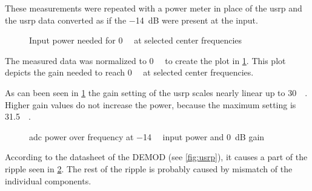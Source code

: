 \documentclass[12pt,a4paper,parskip=full,abstracton]{scrartcl}
\begin{document}
These measurements were repeated with a power meter in place of the
\gls{usrp} and the \gls{usrp} data converted as if the \SI{-14}{\deci\bel}
were present at the input.

\begin{figure}[htb]
    \centering
{}
    \caption{Input power needed for \SI{0}{\deci\belfs} at selected center frequencies}
    \label{fig:inputfscrf}
\end{figure}

The measured data was normalized to \SI{0}{\deci\belfs} to create the plot in \cref{fig:inputfscrf}.
This plot depicts the gain needed to reach \SI{0}{\deci\belfs} at selected center frequencies.

As can been seen in \cref{fig:inputfscrf} the gain setting of the \gls{usrp} scales nearly
linear up to \SI{30}{\deci\belm}. Higher gain values do not increase the power, because
the maximum setting is \SI{31.5}{\deci\belm}.

\begin{figure}[htb]
    \centering
{}
    \caption{\gls{adc} power over frequency at \SI{-14}{\deci\belm} input power and \SI{0}{\deci\bel} gain}
    \label{fig:gainfscrf}
\end{figure}

According to the datasheet of the DEMOD \cite{demod} (see \cref{fig:usrp}), it
causes a part of the ripple seen in \cref{fig:gainfscrf}. The rest of the ripple is
probably caused by mismatch of the individual components.
\end{document}
